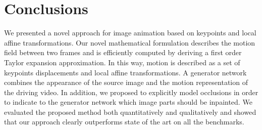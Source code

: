 \documentclass{article}
\begin{document}
\vspace{-0.2cm}
\section{Conclusions}
\vspace{-0.2cm}
We presented a novel approach for image animation based on keypoints and local affine transformations. Our novel mathematical formulation describes the motion field between two frames and is efficiently computed by deriving a first order Taylor expansion approximation. In this way, motion is described as a set of keypoints displacements and local affine transformations. A generator network combines the appearance of the source image and the motion representation of the driving video. In addition, we proposed to explicitly model occlusions in order to indicate to the generator network which image parts should be inpainted. We evaluated the proposed method both quantitatively and qualitatively and showed that our approach clearly outperforms state of the art on all the benchmarks.
\end{document}
